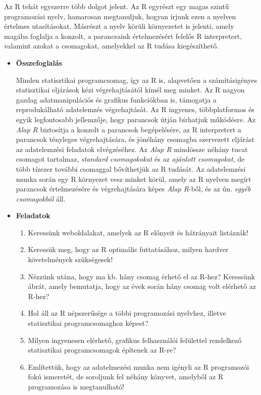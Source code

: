 \documentclass[
]{book}
\providecommand{\tightlist}{%
  \setlength{\itemsep}{0pt}\setlength{\parskip}{0pt}}
\newenvironment{rmdblock}[1]
  {\begin{shaded*}
  \begin{itemize}
  \renewcommand{\labelitemi}{
    \raisebox{-.7\height}[0pt][0pt]{
      {\setkeys{Gin}{width=3em,keepaspectratio}\texttt{[image: images/\#1]}}
    }
  }
  \item
  }
  {
  \end{itemize}
  \end{shaded*}
  }
\newenvironment{rmdsummary}
  {\begin{rmdblock}{summary}}
  {\end{rmdblock}}
\newenvironment{rmdexercise}
  {\begin{rmdblock}{exercise}}
  {\end{rmdblock}}
\begin{document}
Az R tehát egyszerre több dolgot jelent. Az R egyrészt egy magas szintű programozási nyelv, hamarosan megtanuljuk, hogyan írjunk ezen a nyelven értelmes utasításokat. Másrészt a nyelv körüli környezetet is jelenti, amely magába foglalja a konzolt, a parancsaink értelmezésért felelős R interpretert, valamint azokat a csomagokat, amelyekkel az R tudása kiegészíthető.

\begin{rmdsummary}
\textbf{Összefoglalás}

Minden statisztikai programcsomag, így az R is, alapvetően a
számításigényes statisztikai eljárások kézi végrehajtásától kímél meg
minket. Az R nagyon gazdag adatmanipulációs és grafikus funkciókban is,
támogatja a reprodukálható adatelemzés végrehajtását. Az R ingyenes,
többplatformos és egyik legfontosabb jellemzője, hogy parancsok útján
bírhatjuk működésre. Az \emph{Alap R} biztosítja a konzolt a parancsok
begépelésére, az R interpretert a parancsok tényleges végrehajtására, és
jónéhány csomagba szervezett eljárást az adatelemzési feladatok
elvégzéséhez. Az \emph{Alap R} mindössze néhány tucat csomagot
tartalmaz, \emph{standard csomagokokat} és az \emph{ajánlott
csomagokat}, de több tízezer további csomaggal bővíthetjük az R tudását.
Az adatelemzési munka során egy R környezet vesz minket körül, amely az
R nyelven megírt parancsok értelmezésére és végrehajtására képes
\emph{Alap R}-ből, és az ún. \emph{egyéb csomagokból} áll.
\end{rmdsummary}

\begin{rmdexercise}
\textbf{Feladatok}

\begin{enumerate}
\def\labelenumi{\arabic{enumi}.}
\tightlist
\item
  Keressünk weboldalakat, amelyek az R előnyeit és hátrányait listázzák!
\item
  Keressük meg, hogy az R optimális futtatásához, milyen hardver követelmények szükségesek!
\item
  Nézzünk utána, hogy ma kb. hány csomag érhető el az R-hez? Keressünk ábrát, amely bemutatja, hogy az évek során hány csomag volt elérhető az R-hez?
\item
  Hol áll az R népszerűsége a többi programozási nyelvhez, illetve statisztikai programcsomaghoz képest?
\item
  Milyen ingyenesen elérhető, grafikus felhasználói felülettel rendelkező statisztikai programcsomagok építenek az R-re?
\item
  Említettük, hogy az adatelmezési munka nem igényli az R programozói fokú ismeretét, de soroljunk fel néhány könyvet, amelyből az R programozása is megtanulható!
\end{enumerate}
\end{rmdexercise}
\end{document}
